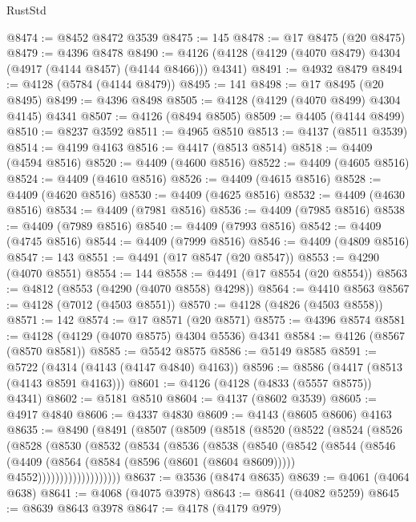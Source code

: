 \begin{lexlean}{RustStd}
\begin{coremodule}
@8474 := @8452 @8472 @3539
@8475 := 145
@8478 := @17 @8475 (@20 @8475)
@8479 := @4396 @8478
@8490 := @4126 (@4128 (@4129 (@4070 @8479) @4304 (@4917 (@4144 @8457) (@4144 @8466))) @4341)
@8491 := @4932 @8479
@8494 := @4128 (@5784 (@4144 @8479))
@8495 := 141
@8498 := @17 @8495 (@20 @8495)
@8499 := @4396 @8498
@8505 := @4128 (@4129 (@4070 @8499) @4304 @4145) @4341
@8507 := @4126 (@8494 @8505)
@8509 := @4405 (@4144 @8499)
@8510 := @8237 @3592
@8511 := @4965 @8510
@8513 := @4137 (@8511 @3539)
@8514 := @4199 @4163
@8516 := @4417 (@8513 @8514)
@8518 := @4409 (@4594 @8516)
@8520 := @4409 (@4600 @8516)
@8522 := @4409 (@4605 @8516)
@8524 := @4409 (@4610 @8516)
@8526 := @4409 (@4615 @8516)
@8528 := @4409 (@4620 @8516)
@8530 := @4409 (@4625 @8516)
@8532 := @4409 (@4630 @8516)
@8534 := @4409 (@7981 @8516)
@8536 := @4409 (@7985 @8516)
@8538 := @4409 (@7989 @8516)
@8540 := @4409 (@7993 @8516)
@8542 := @4409 (@4745 @8516)
@8544 := @4409 (@7999 @8516)
@8546 := @4409 (@4809 @8516)
@8547 := 143
@8551 := @4491 (@17 @8547 (@20 @8547))
@8553 := @4290 (@4070 @8551)
@8554 := 144
@8558 := @4491 (@17 @8554 (@20 @8554))
@8563 := @4812 (@8553 (@4290 (@4070 @8558) @4298))
@8564 := @4410 @8563
@8567 := @4128 (@7012 (@4503 @8551))
@8570 := @4128 (@4826 (@4503 @8558))
@8571 := 142
@8574 := @17 @8571 (@20 @8571)
@8575 := @4396 @8574
@8581 := @4128 (@4129 (@4070 @8575) @4304 @5536) @4341
@8584 := @4126 (@8567 (@8570 @8581))
@8585 := @5542 @8575
@8586 := @5149 @8585
@8591 := @5722 (@4314 (@4143 (@4147 @4840) @4163))
@8596 := @8586 (@4417 (@8513 (@4143 @8591 @4163)))
@8601 := @4126 (@4128 (@4833 (@5557 @8575)) @4341)
@8602 := @5181 @8510
@8604 := @4137 (@8602 @3539)
@8605 := @4917 @4840
@8606 := @4337 @4830
@8609 := @4143 (@8605 @8606) @4163
@8635 := @8490
    (@8491
      (@8507
        (@8509
          (@8518
            (@8520
              (@8522
                (@8524
                  (@8526
                    (@8528
                      (@8530
                        (@8532
                          (@8534
                            (@8536
                              (@8538
                                (@8540
                                  (@8542
                                    (@8544
                                      (@8546
                                        (@4409
                                          (@8564 (@8584 (@8596 (@8601 (@8604 @8609)))))
                                          @4552)))))))))))))))))))
@8637 := @3536 (@8474 @8635)
@8639 := @4061 (@4064 @638)
@8641 := @4068 (@4075 @3978)
@8643 := @8641 (@4082 @5259)
@8645 := @8639 @8643 @3978
@8647 := @4178 (@4179 @979)

\end{coremodule}
\end{lexlean}
